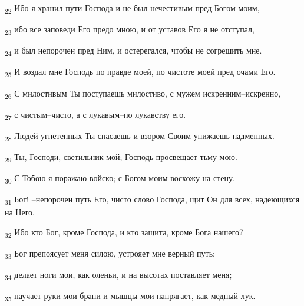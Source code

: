\begin{tcolorbox}
\textsubscript{22} Ибо я хранил пути Господа и не был нечестивым пред Богом моим,
\end{tcolorbox}
\begin{tcolorbox}
\textsubscript{23} ибо все заповеди Его предо мною, и от уставов Его я не отступал,
\end{tcolorbox}
\begin{tcolorbox}
\textsubscript{24} и был непорочен пред Ним, и остерегался, чтобы не согрешить мне.
\end{tcolorbox}
\begin{tcolorbox}
\textsubscript{25} И воздал мне Господь по правде моей, по чистоте моей пред очами Его.
\end{tcolorbox}
\begin{tcolorbox}
\textsubscript{26} С милостивым Ты поступаешь милостиво, с мужем искренним--искренно,
\end{tcolorbox}
\begin{tcolorbox}
\textsubscript{27} с чистым--чисто, а с лукавым--по лукавству его.
\end{tcolorbox}
\begin{tcolorbox}
\textsubscript{28} Людей угнетенных Ты спасаешь и взором Своим унижаешь надменных.
\end{tcolorbox}
\begin{tcolorbox}
\textsubscript{29} Ты, Господи, светильник мой; Господь просвещает тьму мою.
\end{tcolorbox}
\begin{tcolorbox}
\textsubscript{30} С Тобою я поражаю войско; с Богом моим восхожу на стену.
\end{tcolorbox}
\begin{tcolorbox}
\textsubscript{31} Бог! --непорочен путь Его, чисто слово Господа, щит Он для всех, надеющихся на Него.
\end{tcolorbox}
\begin{tcolorbox}
\textsubscript{32} Ибо кто Бог, кроме Господа, и кто защита, кроме Бога нашего?
\end{tcolorbox}
\begin{tcolorbox}
\textsubscript{33} Бог препоясует меня силою, устрояет мне верный путь;
\end{tcolorbox}
\begin{tcolorbox}
\textsubscript{34} делает ноги мои, как оленьи, и на высотах поставляет меня;
\end{tcolorbox}
\begin{tcolorbox}
\textsubscript{35} научает руки мои брани и мышцы мои напрягает, как медный лук.
\end{tcolorbox}
